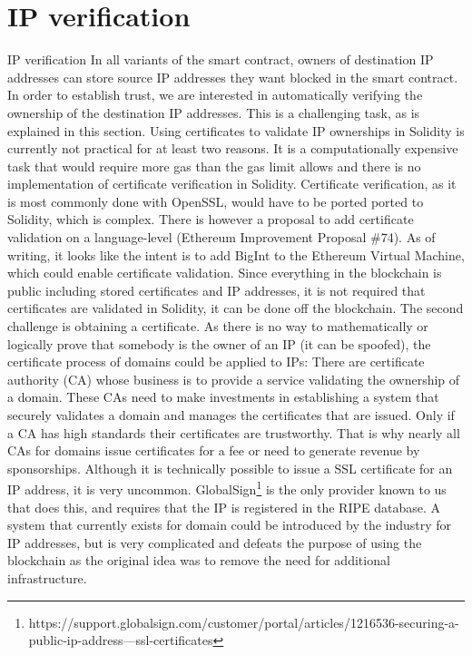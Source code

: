 \section{IP verification}
IP verification
In all variants of the smart contract, owners of destination IP addresses can store source IP addresses they want blocked in the smart contract. In order to establish trust, we are interested in automatically verifying the ownership of the destination IP addresses. This is a challenging task, as is explained in this section. Using certificates to validate IP ownerships in Solidity is currently not practical for at least two reasons.
It is a computationally expensive task that would require more gas than the gas limit allows and there is no implementation of certificate verification in Solidity. Certificate verification, as it is most commonly done with OpenSSL, would have to be ported ported to Solidity, which is complex.
There is however a proposal to add certificate validation on a language-level (Ethereum Improvement Proposal \#74). As of writing, it looks like the intent is to add BigInt to the Ethereum Virtual Machine, which could enable certificate validation.
Since everything in the blockchain is public including stored certificates and IP addresses, it is not required that certificates are validated in Solidity, it can be done off the blockchain.
The second challenge is obtaining a certificate. As there is no way to mathematically or logically prove that somebody is the owner of an IP (it can be spoofed), the certificate process of domains could be applied to IPs: There are certificate authority (CA) whose business is to provide a service validating the ownership of a domain. These CAs need to make investments in establishing a system that securely validates a domain and manages the certificates that are issued. Only if a CA has high standards their certificates are trustworthy. That is why nearly all CAs for domains issue certificates for a fee or need to generate revenue by sponsorships. Although it is technically possible to issue a SSL certificate for an IP address, it is very uncommon. GlobalSign\footnote{https://support.globalsign.com/customer/portal/articles/1216536-securing-a-public-ip-address---ssl-certificates} is the only provider known to us that does this, and requires that the IP is registered in the RIPE database.
A system that currently exists for domain could be introduced by the industry for IP addresses, but is very complicated and defeats the purpose of using the blockchain as the original idea was to remove the need for additional infrastructure.

